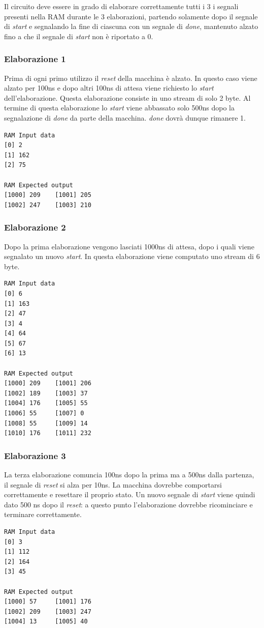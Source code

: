 \documentclass[a4paper]{report}
\begin{document}
Il circuito deve essere in grado di elaborare correttamente tutti i 3 i segnali presenti nella RAM durante le 3 elaborazioni, partendo solamente dopo il segnale di \textit{start} e segnalando la fine di ciascuna con un segnale di \textit{done}, mantenuto alzato fino a che il segnale di \textit{start} non è riportato a 0.

\subsubsection{Elaborazione 1}
Prima di ogni primo utilizzo il \textit{reset} della macchina è alzato. In questo caso viene alzato per 100ns e dopo altri 100ns di attesa viene richiesto lo \textit{start} dell'elaborazione. Questa elaborazione consiste in uno stream di solo 2 byte. Al termine di questa elaborazione lo \textit{start} viene abbassato solo 500ns dopo la segnalazione di \textit{done} da parte della macchina. \textit{done} dovrà dunque rimanere 1.
\begin{verbatim}
RAM Input data
[0] 2
[1] 162
[2] 75

RAM Expected output
[1000] 209    [1001] 205
[1002] 247    [1003] 210
\end{verbatim}

\subsubsection{Elaborazione 2}
Dopo la prima elaborazione vengono lasciati 1000ns di attesa, dopo i quali viene segnalato un nuovo \textit{start}. In questa elaborazione viene computato uno stream di 6 byte.
\begin{verbatim}
RAM Input data
[0] 6
[1] 163
[2] 47
[3] 4
[4] 64
[5] 67
[6] 13
  
RAM Expected output
[1000] 209    [1001] 206
[1002] 189    [1003] 37
[1004] 176    [1005] 55
[1006] 55     [1007] 0
[1008] 55     [1009] 14
[1010] 176    [1011] 232
\end{verbatim}

\subsubsection{Elaborazione 3}
La terza elaborazione comuncia 100ns dopo la prima ma a 500ns dalla partenza, il segnale di \textit{reset} si alza per 10ns. La macchina dovrebbe comportarsi correttamente e resettare il proprio stato. Un nuovo segnale di \textit{start} viene quindi dato 500 ns dopo il \textit{reset}: a questo punto l'elaborazione dovrebbe ricominciare e terminare correttamente.
\begin{verbatim}
RAM Input data
[0] 3
[1] 112
[2] 164
[3] 45
  
RAM Expected output
[1000] 57     [1001] 176
[1002] 209    [1003] 247
[1004] 13     [1005] 40
\end{verbatim}
\end{document}
